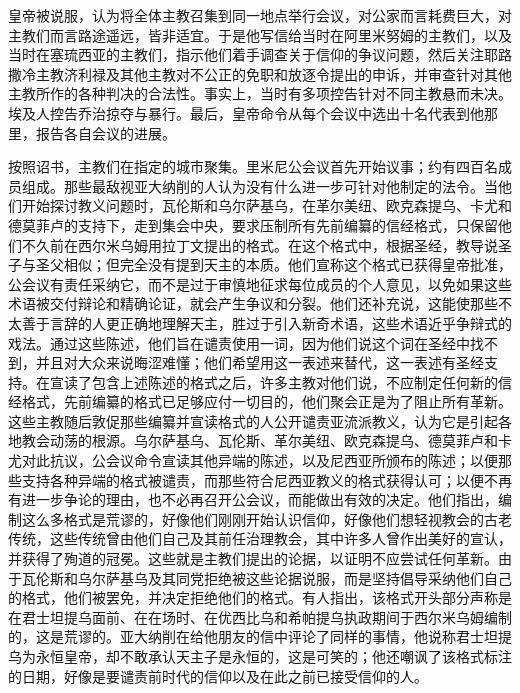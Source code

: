 皇帝被说服，认为将全体主教召集到同一地点举行会议，对公家而言耗费巨大，对主教们而言路途遥远，皆非适宜。于是他写信给当时在阿里米努姆的主教们，以及当时在塞琉西亚的主教们，指示他们着手调查关于信仰的争议问题，然后关注耶路撒冷主教济利禄及其他主教对不公正的免职和放逐令提出的申诉，并审查针对其他主教所作的各种判决的合法性。事实上，当时有多项控告针对不同主教悬而未决。埃及人控告乔治掠夺与暴行。最后，皇帝命令从每个会议中选出十名代表到他那里，报告各自会议的进展。\par

按照诏书，主教们在指定的城市聚集。里米尼公会议首先开始议事；约有四百名成员组成。那些最敌视亚大纳削的人认为没有什么进一步可针对他制定的法令。当他们开始探讨教义问题时，瓦伦斯和乌尔萨基乌，在革尔美纽、欧克森提乌、卡尤和德莫菲卢的支持下，走到集会中央，要求压制所有先前编纂的信经格式，只保留他们不久前在西尔米乌姆用拉丁文提出的格式。在这个格式中，根据圣经，教导说圣子与圣父相似；但完全没有提到天主的本质。他们宣称这个格式已获得皇帝批准，公会议有责任采纳它，而不是过于审慎地征求每位成员的个人意见，以免如果这些术语被交付辩论和精确论证，就会产生争议和分裂。他们还补充说，这能使那些不太善于言辞的人更正确地理解天主，胜过于引入新奇术语，这些术语近乎争辩式的戏法。通过这些陈述，他们旨在谴责使用一词，因为他们说这个词在圣经中找不到，并且对大众来说晦涩难懂；他们希望用这一表述来替代，这一表述有圣经支持。在宣读了包含上述陈述的格式之后，许多主教对他们说，不应制定任何新的信经格式，先前编纂的格式已足够应付一切目的，他们聚会正是为了阻止所有革新。这些主教随后敦促那些编纂并宣读格式的人公开谴责亚流派教义，认为它是引起各地教会动荡的根源。乌尔萨基乌、瓦伦斯、革尔美纽、欧克森提乌、德莫菲卢和卡尤对此抗议，公会议命令宣读其他异端的陈述，以及尼西亚所颁布的陈述；以便那些支持各种异端的格式被谴责，而那些符合尼西亚教义的格式获得认可；以便不再有进一步争论的理由，也不必再召开公会议，而能做出有效的决定。他们指出，编制这么多格式是荒谬的，好像他们刚刚开始认识信仰，好像他们想轻视教会的古老传统，这些传统曾由他们自己及其前任治理教会，其中许多人曾作出美好的宣认，并获得了殉道的冠冕。这些就是主教们提出的论据，以证明不应尝试任何革新。由于瓦伦斯和乌尔萨基乌及其同党拒绝被这些论据说服，而是坚持倡导采纳他们自己的格式，他们被罢免，并决定拒绝他们的格式。有人指出，该格式开头部分声称是在君士坦提乌面前、在在场时、在优西比乌和希帕提乌执政期间于西尔米乌姆编制的，这是荒谬的。亚大纳削在给他朋友的信中评论了同样的事情，他说称君士坦提乌为永恒皇帝，却不敢承认天主子是永恒的，这是可笑的；他还嘲讽了该格式标注的日期，好像是要谴责前时代的信仰以及在此之前已接受信仰的人。\par

